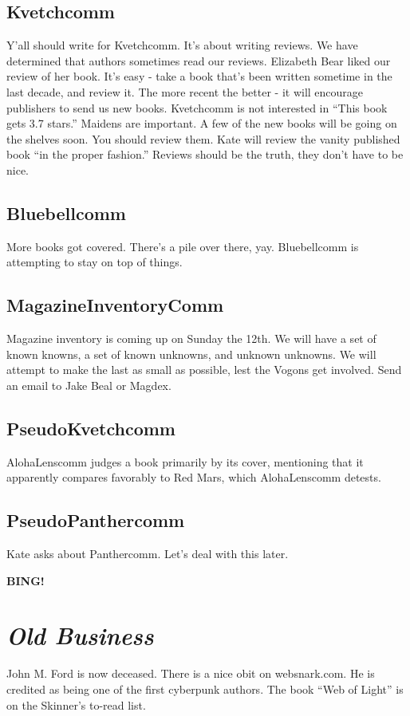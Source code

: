 \documentclass[10pt]{article}
\newcommand{\bing}{{\bf BING!} }
\newcommand{\goto}[1]{\bing \vskip 12pt \section*{{\em{#1}}}}
\begin{document}
\subsection*{Kvetchcomm}
Y'all should write for Kvetchcomm. It's about writing reviews. We have
determined that authors sometimes read our reviews. Elizabeth Bear
liked our review of her book. It's easy - take a book that's
been written sometime in the last decade, and review it. The more
recent the better - it will encourage publishers to send us new books.
Kvetchcomm is not interested in ``This book gets 3.7 stars.'' Maidens
are important. A few of the new books will be going on the shelves
soon. You should review them. Kate will review the vanity published
book ``in the proper fashion.'' Reviews should be the truth, they
don't have to be nice.

\subsection*{Bluebellcomm}
More books got covered. There's a pile over there, yay. Bluebellcomm
is attempting to stay on top of things.

\subsection*{MagazineInventoryComm}
Magazine inventory is coming up on Sunday the 12th. We will have a set
of known knowns, a set of known unknowns, and unknown unknowns. We
will attempt to make the last as small as possible, lest the Vogons
get involved. Send an email to Jake Beal or Magdex.

\subsection*{PseudoKvetchcomm}
AlohaLenscomm judges a book primarily by its cover, mentioning that it
apparently compares favorably to Red Mars, which AlohaLenscomm
detests.

\subsection*{PseudoPanthercomm}
Kate asks about Panthercomm. Let's deal with this later.

\goto{Old Business}
John M. Ford is now deceased. There is a nice obit on websnark.com. He
is credited as being one of the first cyberpunk authors. The book
``Web of Light'' is on the Skinner's to-read list.
\end{document}
